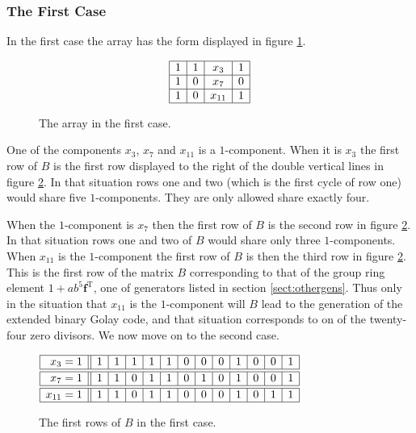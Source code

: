 \subsubsection{The First Case}
In the first case the array has the form displayed in figure \ref{fig:arraycaseone}.
\begin{figure}
\begin{center}
\[
\begin{array}{|c|c|c|c|}
\hline
1 & 1 & x_{ 3} & 1 \\
\hline
1 & 0 & x_{ 7} & 0 \\
\hline
1 & 0 & x_{11} & 1 \\
\hline
\end{array}
\]
\caption{The array in the first case.}
\label{fig:arraycaseone}
\end{center}
\end{figure}
One of the components $x_3$, $x_7$ and $x_{11}$ is a $1$-component.
When it is $x_3$ the first row of $B$ is the first row displayed to the right of the double vertical lines in figure \ref{fig:rowcaseone}.
In that situation rows one and two (which is the first cycle of row one) would share five $1$-components.
They are only allowed share exactly four.

When the $1$-component is $x_7$ then the first row of $B$ is the second row in figure \ref{fig:rowcaseone}.
In that situation rows one and two of $B$ would share only three $1$-components.
When $x_{11}$ is the $1$-component the first row of $B$ is then the third row in figure \ref{fig:rowcaseone}.
This is the first row of the matrix $B$ corresponding to that of the group ring element $1 + a b^5 \mathbf{f}^{\textrm{T}}$, one of generators listed in section \ref{sect:othergens}.
Thus only in the situation that $x_{11}$ is the $1$-component will $B$ lead to the generation of the extended binary Golay code, and that situation corresponds to on of the twenty-four zero divisors.
We now move on to the second case.
\begin{figure}
\begin{center}
$\begin{array}{|r||c|c|c|c|c|c|c|c|c|c|c|c|}
	\hline
	x_{ 3} = 1 & 1 & 1 & 1 & 1 & 1 & 0 & 0 & 0 & 1 & 0 & 0 & 1 \\
	\hline
	\hline
	x_{ 7} = 1 & 1 & 1 & 0 & 1 & 1 & 0 & 1 & 0 & 1 & 0 & 0 & 1 \\
	\hline
	\hline
	x_{11} = 1 & 1 & 1 & 0 & 1 & 1 & 0 & 0 & 0 & 1 & 0 & 1 & 1 \\
	\hline
\end{array}$
\caption{The first rows of $B$ in the first case.}
\label{fig:rowcaseone}
\end{center}
\end{figure}


